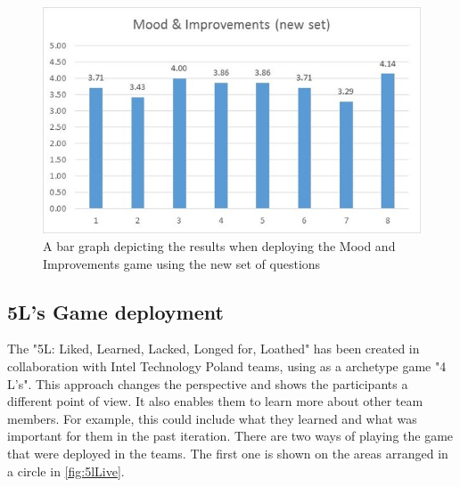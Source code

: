 \begin{figure}[!htbp]
\caption{A bar graph depicting the results when deploying the Mood and Improvements game using the new set of questions}
\label{fig:moodResultsNew}
\centering
\includegraphics[width=1\textwidth]{charts/moodNewSet}
\end{figure}

\subsection{5L's Game deployment}
The "5L: Liked, Learned, Lacked, Longed for, Loathed" has been created in collaboration with Intel Technology Poland teams, using as a archetype game "4 L's". This approach changes the perspective and shows the participants a different point of view. It also enables them to learn more about other team members. For example, this could include what they learned and what was important for them in the past iteration. There are two ways of playing the game that were deployed in the teams. The first one is shown on the areas arranged in a circle in \autoref{fig:5lLive}.

